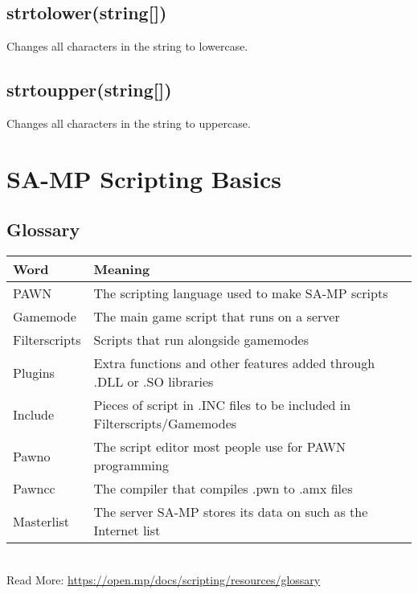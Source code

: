 \documentclass{article}
\begin{document}
\subsection{strtolower(string[])}
Changes all characters in the string to lowercase.

\subsection{strtoupper(string[])}
Changes all characters in the string to uppercase.



\newpage
\section{SA-MP Scripting Basics}

\subsection{Glossary}
\begin{tabular}{ |l|l| } 
\hline
Word & Meaning \\
\hline
PAWN & The scripting language used to make SA-MP scripts \\
Gamemode & The main game script that runs on a server \\
Filterscripts & Scripts that run alongside gamemodes \\
Plugins & Extra functions and other features added through .DLL or .SO libraries \\
Include & Pieces of script in .INC files to be included in Filterscripts/Gamemodes \\
Pawno & The script editor most people use for PAWN programming \\
Pawncc & The compiler that compiles .pwn to .amx files \\
Masterlist & The server SA-MP stores its data on such as the Internet list \\
\hline
\end{tabular}
\bigskip
\\Read More: \url{https://open.mp/docs/scripting/resources/glossary}
\end{document}
